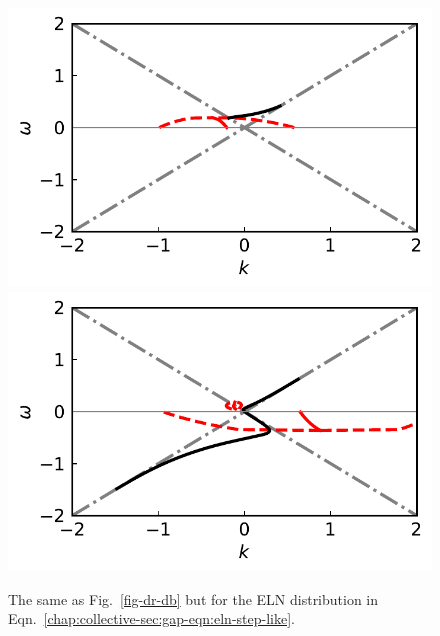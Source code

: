 \begin{figure}
   \includegraphics[width=\linewidth]{chapters/assets/dr/spectBoxC1MAADRPltBlob.pdf}
   \endminipage\hfill
   \includegraphics[width=\linewidth]{chapters/assets/dr/spectBoxC1MZADRPltBlob.pdf}
   \endminipage\hfill
   \caption{The same as Fig.~\ref{fig-dr-db} but for the ELN distribution in Eqn.~\ref{chap:collective-sec:gap-eqn:eln-step-like}.
    }
   \label{fig-box-c1}
\end{figure}



